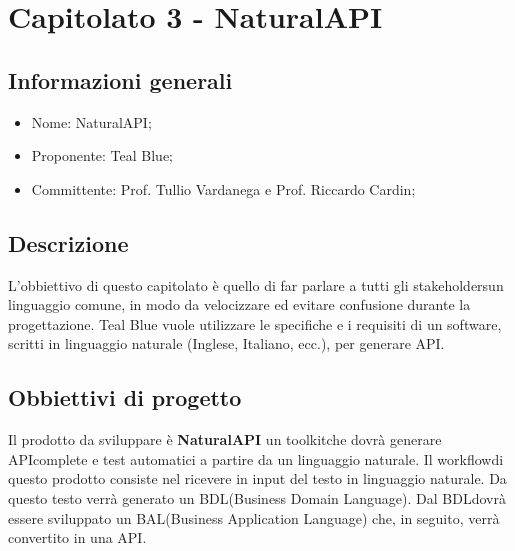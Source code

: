 \section{Capitolato 3 - NaturalAPI}
\subsection{Informazioni generali}
\begin{itemize}
	\item Nome: NaturalAPI;
	\item Proponente: Teal Blue;
	\item Committente: Prof. Tullio Vardanega e Prof. Riccardo Cardin;
\end{itemize}
\subsection{Descrizione}
L'obbiettivo di questo capitolato è quello di far parlare a tutti gli stakeholders\glosp un linguaggio comune, in modo da velocizzare ed evitare confusione durante la progettazione. Teal Blue vuole utilizzare le specifiche e i requisiti di un software, scritti in linguaggio naturale (Inglese, Italiano, ecc.), per generare API\glo.

\subsection{Obbiettivi di progetto}
Il prodotto da sviluppare è \textbf{NaturalAPI} un toolkit\glosp che dovrà generare API\glosp complete e test automatici a partire da un linguaggio naturale. Il workflow\glosp di questo prodotto consiste nel ricevere in input del testo in linguaggio naturale. Da questo testo verrà generato un BDL\glosp (Business Domain Language). Dal BDL\glosp dovrà essere sviluppato un BAL\glosp (Business Application Language) che, in seguito, verrà convertito in una API\glo.

